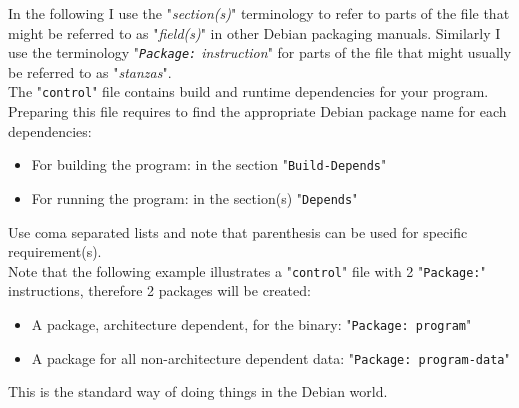 In the following I use the "{\em{section(s)}}" terminology to refer to parts of the file that might be referred to as "{\em{field(s)}}" in other Debian packaging manuals. 
Similarly I use the terminology "{\em{\texttt{Package:} instruction}}" for parts of the file that might usually be referred to as "{\em{stanzas}}". \\[0.25cm]
The "\texttt{control}" file contains build and runtime dependencies for your program. \\
Preparing this file requires to find the appropriate Debian package name for each dependencies: 
\begin{itemize}
\item For building the program: in the section "\texttt{Build-Depends}"
\item For running the program: in the section(s) "\texttt{Depends}" 
\end{itemize}
Use coma separated lists and note that parenthesis can be used for specific requirement(s). \\
Note that the following example illustrates a "\texttt{control}" file with 2 "\texttt{Package:}" instructions, therefore 2 packages will be created:
\begin{itemize}
\item A package, architecture dependent, for the binary: "\texttt{Package: program}"
\item A package for all non-architecture dependent data: "\texttt{Package: program-data}" 
\end{itemize}
This is the standard way of doing things in the Debian world. 
\vspace{-2cm}
